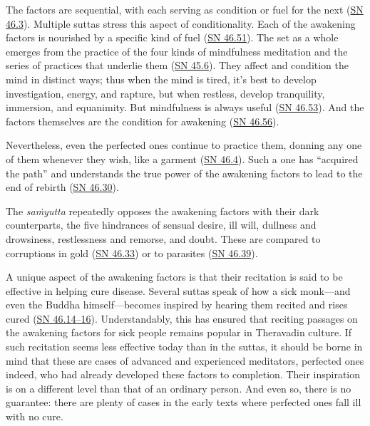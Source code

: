 \documentclass[12pt,openany]{book}%
\begin{document}
The factors are sequential, with each serving as condition or fuel for the next (\href{https://suttacentral.net/sn46.3}{SN 46.3}). Multiple suttas stress this aspect of conditionality. Each of the awakening factors is nourished by a specific kind of fuel (\href{https://suttacentral.net/sn46.51}{SN 46.51}). The set as a whole emerges from the practice of the four kinds of mindfulness meditation and the series of practices that underlie them (\href{https://suttacentral.net/sn45.6}{SN 45.6}). They affect and condition the mind in distinct ways; thus when the mind is tired, it’s best to develop investigation, energy, and rapture, but when restless, develop tranquility, immersion, and equanimity. But mindfulness is always useful (\href{https://suttacentral.net/sn46.53}{SN 46.53}). And the factors themselves are the condition for awakening (\href{https://suttacentral.net/sn46.56}{SN 46.56}).

Nevertheless, even the perfected ones continue to practice them, donning any one of them whenever they wish, like a garment (\href{https://suttacentral.net/sn46.4}{SN 46.4}). Such a one has “acquired the path” and understands the true power of the awakening factors to lead to the end of rebirth (\href{https://suttacentral.net/sn46.30}{SN 46.30}).

The \textit{\textsanskrit{saṁyutta}} repeatedly opposes the awakening factors with their dark counterparts, the five hindrances of sensual desire, ill will, dullness and drowsiness, restlessness and remorse, and doubt. These are compared to corruptions in gold (\href{https://suttacentral.net/sn46.33}{SN 46.33}) or to parasites (\href{https://suttacentral.net/sn46.39}{SN 46.39}).

A unique aspect of the awakening factors is that their recitation is said to be effective in helping cure disease. Several suttas speak of how a sick monk—and even the Buddha himself—becomes inspired by hearing them recited and rises cured (\href{https://suttacentral.net/sn46.14}{SN 46.14–16}). Understandably, this has ensured that reciting passages on the awakening factors for sick people remains popular in Theravadin culture. If such recitation seems less effective today than in the suttas, it should be borne in mind that these are cases of advanced and experienced meditators, perfected ones indeed, who had already developed these factors to completion. Their inspiration is on a different level than that of an ordinary person. And even so, there is no guarantee: there are plenty of cases in the early texts where perfected ones fall ill with no cure.
\end{document}
